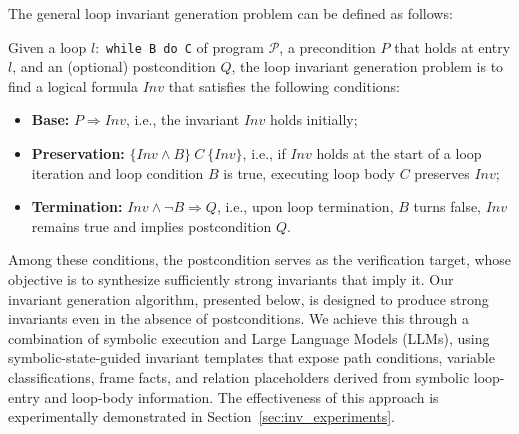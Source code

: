 
The general loop invariant generation problem can be defined as follows:
\begin{definition} Given a loop $l:\!$ \texttt{while B do C} of program $\mathcal{P}$, a precondition $P$ that holds at entry $l$, and an (optional) postcondition $Q$, the loop invariant generation problem is to find a logical formula $\textit{Inv}$ 
that satisfies the following conditions:
\begin{itemize}
    \item \textbf{Base:} $P \Rightarrow \textit{Inv}$, i.e., the invariant $\textit{Inv}$ holds initially;
    \item \textbf{Preservation:} $\{\textit{Inv} \land B\}\ C\ \{\textit{Inv}\}$, i.e., if $\textit{Inv}$ holds at the start of a loop iteration and loop condition $B$ is true, executing loop body $C$ preserves $\textit{Inv}$;
\item  \textbf{Termination:} $\textit{Inv} \land \neg B \Rightarrow Q$, i.e., upon loop termination, $B$ turns false, $\textit{Inv}$ remains true and implies postcondition $Q$.
\end{itemize}
  \label{Def:invariant}   
\end{definition}

Among these conditions, the postcondition serves as the verification target, whose objective is to synthesize sufficiently strong invariants that imply it. Our invariant generation algorithm, presented below, is designed to produce strong invariants even in the absence of postconditions. We achieve this through a combination of symbolic execution and Large Language Models (LLMs), using symbolic-state-guided invariant templates that expose path conditions, variable classifications, frame facts, and relation placeholders derived from symbolic loop-entry and loop-body information.
The effectiveness of this approach is experimentally demonstrated in Section~\ref{sec:inv_experiments}.
  

